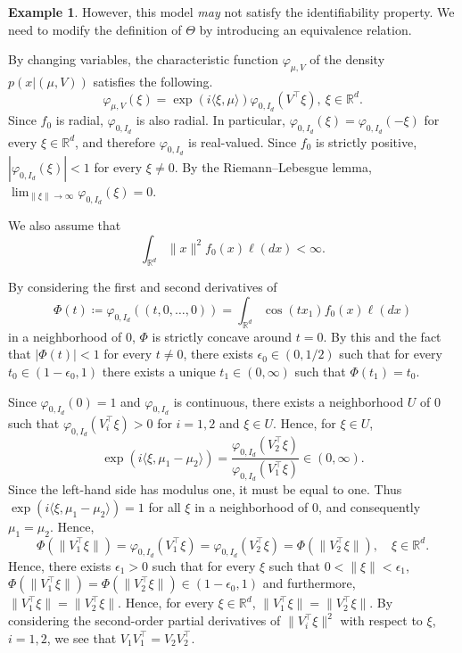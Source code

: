 \documentclass[a4paper, reqno, 11pt]{article}
\theoremstyle{definition}
\newtheorem{Exa}[Thm]{Example}
\begin{document}
\begin{Exa}
However, this model {\it may} not satisfy the identifiability property. 
We need to modify the definition of $\Theta$ by introducing an equivalence relation. 

By changing variables, the characteristic function $\varphi_{\mu, V}$ of the density $p(x | (\mu, V) )$ satisfies the following. 
\[ \varphi_{\mu, V}(\xi) = \exp\left(i \langle \xi, \mu\rangle\right) \varphi_{0, I_d} \left(V^{\top} \xi\right), \ \xi \in \mathbb{R}^d.  \]
Since $f_0$ is radial, $\varphi_{0, I_d} $ is also radial. 
In particular, $\varphi_{0, I_d}(\xi) = \varphi_{0, I_d}(-\xi)$ for every $\xi \in \mathbb{R}^d$, and therefore $\varphi_{0, I_d}$ is real-valued. 
Since $f_0$ is strictly positive, 
$\left| \varphi_{0, I_d} (\xi) \right| < 1$ for every $\xi \ne 0$. 
By the Riemann--Lebesgue lemma, 
$\displaystyle \lim_{\|\xi\| \to \infty} \varphi_{0, I_d} (\xi) = 0$. 


We also assume that 
\begin{equation}\label{eq:second-integrable}
\int_{\mathbb{R}^d} \|x\|^2 f_0 (x) \ell(dx) < \infty. 
\end{equation}

By considering the first and second derivatives of 
\[ \Phi(t) \coloneqq   \varphi_{0, I_d} \left((t,0,\dots,0) \right) = \int_{\mathbb{R}^d} \cos(tx_1) f_0 (x) \ell(dx) \] 
in a neighborhood of $0$, 
$\Phi$ is strictly concave around $t = 0$. 
By this and the fact that $|\Phi(t)| < 1$ for every $t \ne 0$, 
there exists $\epsilon_0 \in (0,1/2)$ such that for every $t_0 \in (1-\epsilon_0,1)$ there exists a unique $t_1 \in (0,\infty)$ such that $\Phi(t_1) = t_0$. 


Since $\varphi_{0,I_d}(0) = 1$ and $\varphi_{0,I_d}$ is continuous, there exists
a neighborhood $U$ of $0$ such that
$\varphi_{0,I_d}(V_i^\top \xi) > 0$ for $i=1,2$ and $\xi \in U$.
Hence, for $\xi \in U$,
\[ \exp(i\langle \xi,\mu_1 - \mu_2 \rangle) = \frac{\varphi_{0,I_d}(V_2^\top\xi)}{\varphi_{0,I_d}(V_1^\top\xi)} \in (0,\infty). \]
Since the left-hand side has modulus one, it must be equal to one. Thus
$\exp(i\langle \xi,\mu_1 - \mu_2\rangle) = 1$ for all $\xi$ in a neighborhood of $0$,
and consequently $\mu_1 = \mu_2$.  
Hence, 
\[   \Phi\left( \| V_1^{\top} \xi \|\right) = \varphi_{0, I_d} \left(V_1^{\top} \xi\right) = \varphi_{0, I_d} \left(V_2^{\top} \xi\right) = \Phi\left(\| V_2^{\top} \xi \|\right), \quad \xi \in \mathbb{R}^d. \]
Hence, there exists $\epsilon_1 > 0$ such that for every $\xi$ such that $0 < \|\xi\| < \epsilon_1$, 
$\Phi(\| V_1^{\top} \xi \|) = \Phi(\| V_2^{\top} \xi \|) \in (1-\epsilon_0, 1)$ and furthermore, $\| V_1^{\top} \xi \| = \| V_2^{\top} \xi \|$. 
Hence, for every $\xi \in \mathbb{R}^d$, 
$\| V_1^{\top} \xi \| = \| V_2^{\top} \xi \|$. 
By considering the second-order partial derivatives of $\|V_i^{\top} \xi\|^2$ with respect to $\xi$, $i=1,2$, 
we see that $V_1 V_1^{\top} = V_2 V_2^{\top}$. 


\end{Exa}
\end{document}
